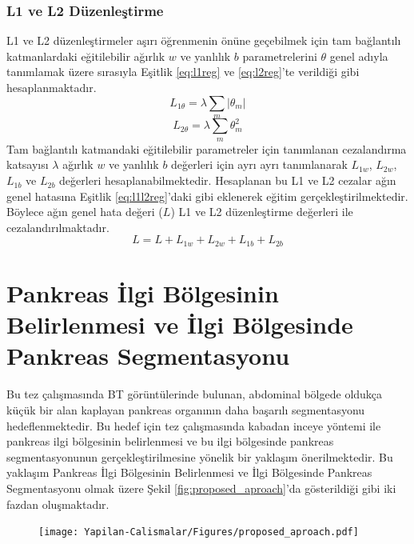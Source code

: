 \subsubsection{L1 ve L2 Düzenleştirme} 
L1 ve L2 düzenleştirmeler aşırı öğrenmenin önüne geçebilmek için tam bağlantılı katmanlardaki eğitilebilir ağırlık $w$ ve yanlılık $b$ parametrelerini $\theta$ genel adıyla tanımlamak üzere sırasıyla Eşitlik \ref{eq:l1reg} ve \ref{eq:l2reg}'te verildiği gibi hesaplanmaktadır.
\begin{equation}
	\label{eq:l1reg}
	L_{1 \theta}=\lambda \sum_{m}\left|\theta_{m}\right|
\end{equation}
\vspace{-1cm}
\begin{equation}
	\label{eq:l2reg}
	L_{2 \theta}=\lambda \sum_{m}\theta_{m}^{2}
\end{equation}
Tam bağlantılı katmandaki eğitilebilir parametreler için tanımlanan cezalandırma katsayısı $\lambda$ ağırlık $w$ ve yanlılık $b$ değerleri için ayrı ayrı tanımlanarak $L_{1w}$, $L_{2w}$, $L_{1b}$ ve $L_{2b}$ değerleri hesaplanabilmektedir. Hesaplanan bu L1 ve L2 cezalar ağın genel hatasına Eşitlik \ref{eq:l1l2reg}'daki gibi eklenerek eğitim gerçekleştirilmektedir. Böylece ağın genel hata değeri ($L$) L1 ve L2 düzenleştirme değerleri ile cezalandırılmaktadır. 
\begin{equation}
	\label{eq:l1l2reg}
	L = L + L_{1w} + L_{2w} + L_{1b} + L_{2b}
\end{equation}

\section{Pankreas İlgi Bölgesinin Belirlenmesi ve İlgi Bölgesinde Pankreas Segmentasyonu \label{sec:pancreas}}

Bu tez çalışmasında BT görüntülerinde bulunan, abdominal bölgede oldukça küçük bir alan kaplayan pankreas organının daha başarılı segmentasyonu hedeflenmektedir. Bu hedef için tez çalışmasında kabadan inceye yöntemi ile pankreas ilgi bölgesinin belirlenmesi ve bu ilgi bölgesinde pankreas segmentasyonunun gerçekleştirilmesine yönelik bir yaklaşım önerilmektedir. Bu yaklaşım Pankreas İlgi Bölgesinin   Belirlenmesi ve İlgi Bölgesinde Pankreas Segmentasyonu olmak üzere Şekil \ref{fig:proposed_aproach}'da gösterildiği gibi iki fazdan oluşmaktadır.

\begin{figure}[h!]
	\begin{center}
		\vspace{0.4cm}
		{
			\vspace{0.4cm}
			\texttt{[image: Yapilan-Calismalar/Figures/proposed\_aproach.pdf]}
		}
	\end{center}
\end{figure}

